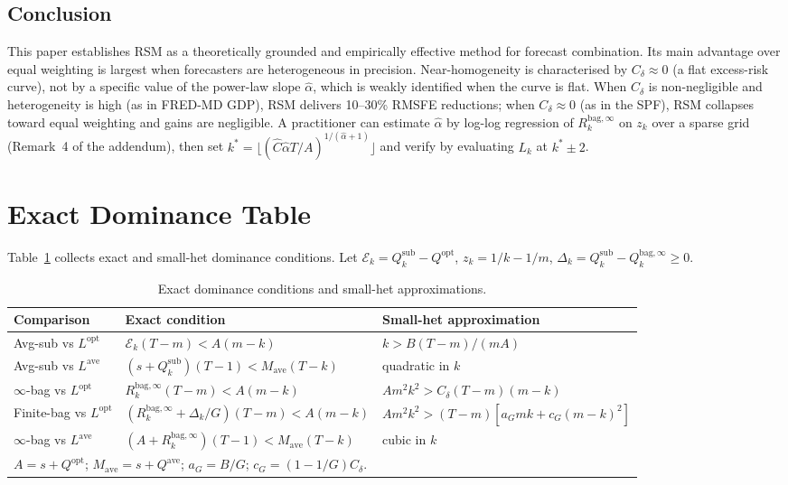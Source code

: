\documentclass[12pt,a4paper]{article}
\theoremstyle{definition}
\begin{document}
\subsection{Conclusion}

This paper establishes RSM as a theoretically grounded and empirically effective
method for forecast combination. Its main advantage over equal weighting is
largest when forecasters are heterogeneous in precision. Near-homogeneity is
characterised by $C_\delta\approx0$ (a flat excess-risk curve), not by a
specific value of the power-law slope $\hat\alpha$, which is weakly identified
when the curve is flat. When $C_\delta$ is non-negligible and heterogeneity is
high (as in FRED-MD GDP), RSM delivers 10--30\% RMSFE reductions; when
$C_\delta\approx0$ (as in the SPF), RSM collapses toward equal weighting and
gains are negligible. A practitioner can estimate $\hat\alpha$
by log-log regression of $R_k^{\mathrm{bag},\infty}$ on $z_k$ over a sparse
grid (Remark~4 of the addendum), then set $k^*=\lfloor(\hat C\hat\alpha T/A)^{1/(\hat\alpha+1)}\rfloor$
and verify by evaluating $L_k$ at $k^*\pm2$.

\appendix

\section{Exact Dominance Table}
\label{app:dom}

Table~\ref{tab:dom} collects exact and small-het dominance conditions. Let
$\mathcal{E}_k=Q_k^{\mathrm{sub}}-Q^{\mathrm{opt}}$, $z_k=1/k-1/m$,
$\Delta_k=Q_k^{\mathrm{sub}}-Q_k^{\mathrm{bag},\infty}\geq0$.

\begin{table}[ht]
\centering
\caption{Exact dominance conditions and small-het approximations.}
\label{tab:dom}
\footnotesize
\begin{tabular}{p{3.2cm}p{4.5cm}p{5cm}}
\toprule
Comparison & Exact condition & Small-het approximation \\
\midrule
Avg-sub vs $L^{\mathrm{opt}}$
  & $\mathcal{E}_k(T-m)<A(m-k)$
  & $k>B(T-m)/(mA)$ \\
Avg-sub vs $L^{\mathrm{ave}}$
  & $(s+Q_k^{\mathrm{sub}})(T-1)<M_{\mathrm{ave}}(T-k)$
  & quadratic in $k$ \\
$\infty$-bag vs $L^{\mathrm{opt}}$
  & $R_k^{\mathrm{bag},\infty}(T-m)<A(m-k)$
  & $Am^2k^2>C_\delta(T-m)(m-k)$ \\
Finite-bag vs $L^{\mathrm{opt}}$
  & $(R_k^{\mathrm{bag},\infty}+\Delta_k/G)(T-m)<A(m-k)$
  & $Am^2k^2>(T-m)[a_Gmk+c_G(m-k)^2]$ \\
$\infty$-bag vs $L^{\mathrm{ave}}$
  & $(A+R_k^{\mathrm{bag},\infty})(T-1)<M_{\mathrm{ave}}(T-k)$
  & cubic in $k$ \\
\bottomrule
\multicolumn{3}{l}{$A=s+Q^{\mathrm{opt}}$; $M_{\mathrm{ave}}=s+Q^{\mathrm{ave}}$;
  $a_G=B/G$; $c_G=(1-1/G)C_\delta$.}
\end{tabular}
\end{table}
\end{document}
